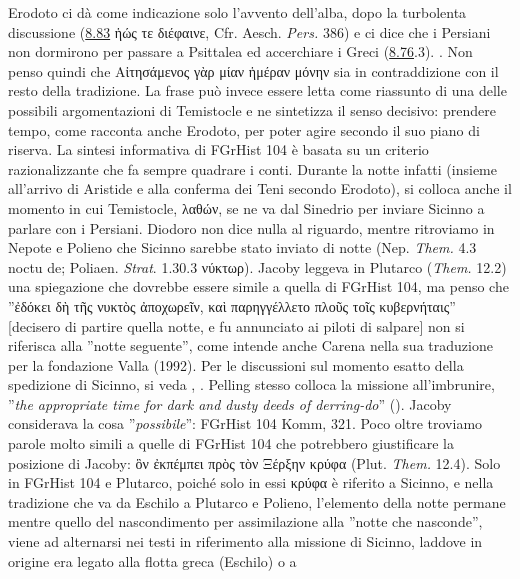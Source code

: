 {Erodoto ci dà come indicazione solo l'avvento dell'alba, dopo la turbolenta discussione (\href{http://data.perseus.org/citations/urn:cts:greekLit:tlg0016.tlg001.perseus-grc1:8.83}{8.83} \textgreek{ἡώς τε διέφαινε}, Cfr. Aesch. \emph{Pers.} 386) e ci dice che i Persiani non dormirono per passare a Psittalea ed accerchiare i Greci (\href{http://data.perseus.org/citations/urn:cts:greekLit:tlg0016.tlg001.perseus-grc1:8.76}{8.76}.3). \cite[188-9]{Garvie2009}. Non penso quindi che \textgreek{Αἰτησάμενος γὰρ μίαν ἡμέραν μόνην} sia in contraddizione con il resto della tradizione. La frase può invece essere letta come riassunto di una delle possibili argomentazioni di Temistocle e ne sintetizza il senso decisivo: prendere tempo, come racconta anche Erodoto, per poter agire secondo il suo piano di riserva. La sintesi informativa di FGrHist 104 è basata su un criterio razionalizzante che fa sempre quadrare i conti. Durante la notte infatti (insieme all'arrivo di Aristide e alla conferma dei Teni secondo Erodoto), si colloca anche il momento in cui Temistocle, \textgreek{λαθών}, se ne va dal Sinedrio per inviare Sicinno a parlare con i Persiani.  Diodoro non dice nulla al riguardo, mentre ritroviamo in  Nepote e Polieno che Sicinno sarebbe stato inviato di notte (Nep. \emph{Them.} 4.3 noctu de; Poliaen. \emph{Strat}. 1.30.3 \textgreek{νύκτωρ}). Jacoby leggeva in Plutarco (\emph{Them.} 12.2) una spiegazione che dovrebbe essere simile a quella di FGrHist 104, ma penso che ''\textgreek{ἐδόκει δὴ τῆς νυκτὸς ἀποχωρεῖν, καὶ παρηγγέλλετο πλοῦς τοῖς κυβερνήταις}'' [decisero di partire quella notte, e fu annunciato ai piloti di salpare] non si riferisca alla ''notte seguente'', come intende anche Carena nella sua traduzione per la fondazione Valla (1992). Per le discussioni sul momento esatto della spedizione di Sicinno, si veda \cite[2 n. 6]{Pelling1997}, \cite[170]{Lazenby1988}. Pelling stesso colloca la missione all'imbrunire, ''\emph{the appropriate time for dark and dusty deeds of derring-do}'' (\cite[3]{Pelling1997}). Jacoby considerava la cosa ''\emph{possibile}'': FGrHist 104 Komm, 321. Poco oltre troviamo parole molto simili a quelle di FGrHist 104 che potrebbero giustificare la posizione di Jacoby: \textgreek{ὃν ἐκπέμπει πρὸς τὸν Ξέρξην κρύφα} (Plut. \emph{Them.}   12.4). Solo in FGrHist 104 e Plutarco, poiché solo in essi \textgreek{κρύφα} è riferito a Sicinno, e nella tradizione che va da Eschilo a Plutarco e Polieno, l'elemento della notte permane mentre quello del nascondimento per assimilazione alla ''notte che nasconde'', viene ad alternarsi nei testi in riferimento alla missione di Sicinno, laddove in origine era legato alla flotta greca (Eschilo) o a }
